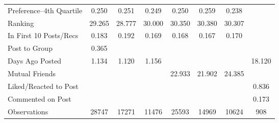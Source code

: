 {\begin{tabular}{l*{7}{c}}
Preference--4th Quartile&       0.250&       0.251&       0.249&       0.250&       0.259&       0.238&            \\
Ranking             &      29.265&      28.777&      30.000&      30.350&      30.380&      30.307&            \\
In First 10 Posts/Recs&       0.183&       0.192&       0.169&       0.168&       0.167&       0.170&            \\
Post to Group       &       0.365&            &            &            &            &            &            \\
Days Ago Posted     &       1.134&       1.120&       1.156&            &            &            &      18.120\\
Mutual Friends      &            &            &            &      22.933&      21.902&      24.385&            \\
Liked/Reacted to Post&            &            &            &            &            &            &       0.836\\
Commented on Post   &            &            &            &            &            &            &       0.173\\
\midrule
Observations        &       28747&       17271&       11476&       25593&       14969&       10624&         908\\
\bottomrule
\end{tabular}
}
